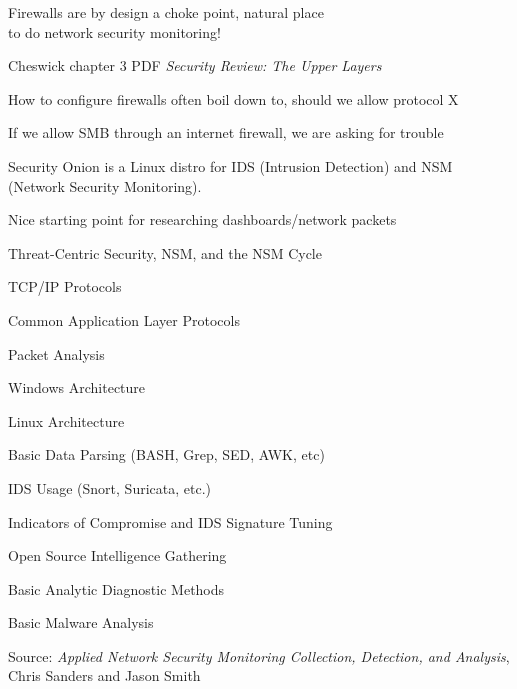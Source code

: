 \documentclass[Screen16to9,17pt]{foils}
\begin{document}
Firewalls are by design a choke point, natural place \\
to do network security monitoring!


\begin{list1}
\item {}
\item Cheswick chapter 3 PDF
\emph{Security Review: The Upper Layers}
\begin{list2}
\item How to configure firewalls often boil down to, should we allow protocol X
\item If we allow SMB through an internet firewall, we are asking for trouble
\end{list2}
\end{list1}



Security Onion is a Linux distro for IDS (Intrusion Detection) and NSM (Network Security Monitoring).\\

\centerline{Nice starting point for researching dashboards/network packets}



\begin{list2}\small
\item Threat-Centric Security, NSM, and the NSM Cycle
\item TCP/IP Protocols
\item Common Application Layer Protocols
\item Packet Analysis
\item Windows Architecture
\item Linux Architecture
\item Basic Data Parsing (BASH, Grep, SED, AWK, etc)
\item IDS Usage (Snort, Suricata, etc.)
\item Indicators of Compromise and IDS Signature Tuning
\item Open Source Intelligence Gathering
\item Basic Analytic Diagnostic Methods
\item Basic Malware Analysis
\end{list2}

Source: \emph{Applied Network Security Monitoring Collection, Detection, and Analysis}, Chris Sanders and Jason Smith
\end{document}
